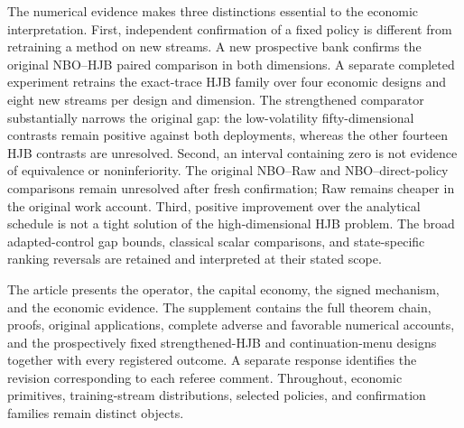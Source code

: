The numerical evidence makes three distinctions essential to the economic interpretation. First, independent confirmation of a fixed policy is different from retraining a method on new streams. A new prospective bank confirms the original NBO--HJB paired comparison in both dimensions. A separate completed experiment retrains the exact-trace HJB family over four economic designs and eight new streams per design and dimension. The strengthened comparator substantially narrows the original gap: the low-volatility fifty-dimensional contrasts remain positive against both deployments, whereas the other fourteen HJB contrasts are unresolved. Second, an interval containing zero is not evidence of equivalence or noninferiority. The original NBO--Raw and NBO--direct-policy comparisons remain unresolved after fresh confirmation; Raw remains cheaper in the original work account. Third, positive improvement over the analytical schedule is not a tight solution of the high-dimensional HJB problem. The broad adapted-control gap bounds, classical scalar comparisons, and state-specific ranking reversals are retained and interpreted at their stated scope.

The article presents the operator, the capital economy, the signed mechanism, and the economic evidence. The supplement contains the full theorem chain, proofs, original applications, complete adverse and favorable numerical accounts, and the prospectively fixed strengthened-HJB and continuation-menu designs together with every registered outcome. A separate response identifies the revision corresponding to each referee comment. Throughout, economic primitives, training-stream distributions, selected policies, and confirmation families remain distinct objects.
